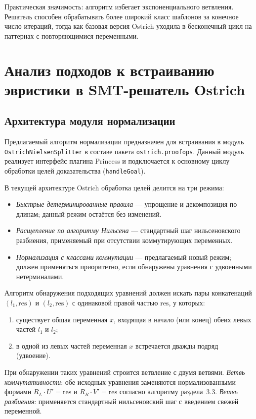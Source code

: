 \documentclass[14pt, russian]{scrartcl}
\begin{document}
Практическая значимость: алгоритм избегает экспоненциального ветвления.
Решатель способен обрабатывать более широкий класс шаблонов за конечное
число итераций, тогда как базовая версия Ostrich уходила в бесконечный цикл
на паттернах с повторяющимися переменными.

\section{Анализ подходов к встраиванию эвристики в SMT-решатель Ostrich}

\subsection{Архитектура модуля нормализации}

Предлагаемый алгоритм нормализации предназначен для встраивания в модуль
\texttt{OstrichNielsenSplitter} в составе пакета \texttt{ostrich.proofops}.
Данный модуль реализует интерфейс плагина Princess и подключается к основному
циклу обработки целей доказательства (\texttt{handleGoal}).

В текущей архитектуре Ostrich обработка целей делится на три режима:
\begin{itemize}
\item \emph{Быстрые детерминированные правила} --- упрощение и декомпозиция
  по длинам; данный режим остаётся без изменений.
\item \emph{Расщепление по алгоритму Нильсена} --- стандартный шаг нильсеновского
  разбиения, применяемый при отсутствии коммутирующих переменных.
\item \emph{Нормализация с классами коммутации} --- предлагаемый новый режим;
  должен применяться приоритетно, если обнаружены уравнения с удвоенными
  нетерминалами.
\end{itemize}

Алгоритм обнаружения подходящих уравнений должен искать пары конкатенаций
$(l_1, \text{res})$ и $(l_2, \text{res})$ с одинаковой правой частью $\text{res}$,
у которых:
\begin{enumerate}
\item существует общая переменная $x$, входящая в начало (или конец)
  обеих левых частей $l_1$ и $l_2$;
\item в одной из левых частей переменная $x$ встречается дважды подряд (удвоение).
\end{enumerate}

При обнаружении таких уравнений строится ветвление с двумя ветвями.
\emph{Ветвь коммутативности}: обе исходных уравнения заменяются нормализованными
формами $R_L \cdot U' = \text{res}$ и $R_R \cdot V' = \text{res}$ согласно
алгоритму раздела~3.3.
\emph{Ветвь разбиения}: применяется стандартный нильсеновский шаг с введением
свежей переменной.
\end{document}

